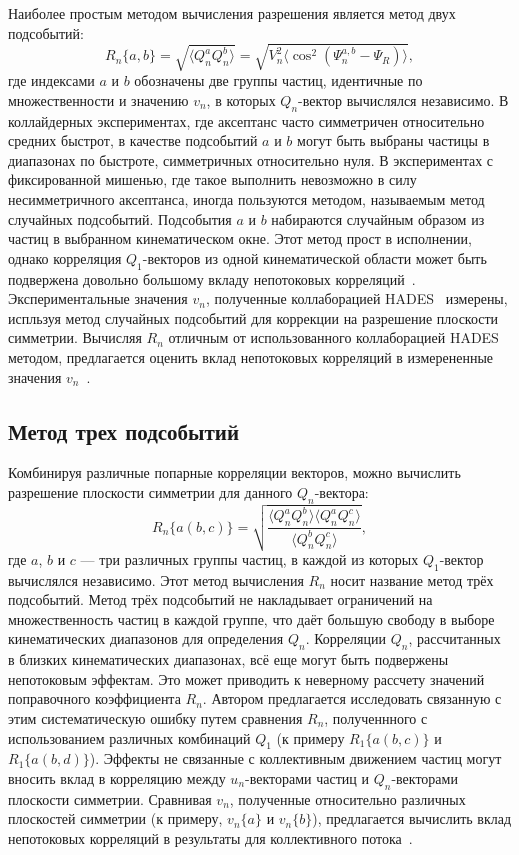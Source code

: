 Наиболее простым методом вычисления разрешения является метод двух подсобытий:
%
\begin{equation}
    R_n\{a,b\} = \sqrt{ \langle Q_n^a Q_n^b \rangle } = \sqrt{ V_n^2 \langle \cos^{2}( \Psi^{a,b}_n - \Psi_R ) \rangle },
\end{equation}
где индексами $a$ и $b$ обозначены две группы частиц, идентичные по множественности и значению $v_n$, в которых $Q_n$-вектор вычислялся независимо.
В коллайдерных экспериментах, где аксептанс часто симметричен относительно средних быстрот, в качестве подсобытий $a$ и $b$ могут быть выбраны частицы в диапазонах по быстроте, симметричных относительно нуля.
В экспериментах с фиксированной мишенью, где такое выполнить невозможно в силу несимметричного аксептанса, иногда пользуются методом, называемым метод случайных подсобытий.
Подсобытия $a$ и $b$ набираются случайным образом из частиц в выбранном кинематическом окне.
Этот метод прост в исполнении, однако корреляция $Q_1$-векторов из одной кинематической области может быть подвержена довольно большому вкладу непотоковых корреляций~\cite{Mamaev:2020lpi}.
Экспериментальные значения $v_n$, полученные коллаборацией HADES~\cite{HADES:2020lob} измерены, испльзуя метод случайных подсобытий для коррекции на разрешение плоскости симметрии. 
Вычисляя $R_n$ отличным от использованного коллаборацией HADES методом, предлагается оценить вклад непотоковых корреляций в измерененные значения $v_n$~\cite{Mamaev:2020lpi, Mamaev:2020qom}.

\subsection{Метод трех подсобытий}

Комбинируя различные попарные корреляции векторов, можно вычислить разрешение плоскости симметрии для данного $Q_n$-вектора:
%
\begin{equation}
    R_n\{a(b,c)\}  =  \sqrt { \frac{ \langle Q_n^a Q_n^b \rangle \langle Q_n^a Q_n^c \rangle }{ \langle Q_n^b Q_n^c \rangle} },
\end{equation}
%
где $a$, $b$ и $c$ --- три различных группы частиц, в каждой из которых $Q_1$-вектор вычислялся независимо.
Этот метод вычисления $R_n$ носит название метод трёх подсобытий.
Метод трёх подсобытий не накладывает ограничений на множественность частиц в каждой группе, что даёт большую свободу в выборе кинематических диапазонов для определения $Q_n$.
Корреляции $Q_n$, рассчитанных в близких кинематических диапазонах, всё еще могут быть подвержены непотоковым эффектам.
Это может приводить к неверному рассчету значений поправочного коэффициента $R_n$.
Автором предлагается исследовать связанную с этим систематическую ошибку путем сравнения $R_n$, полученнного с использованием различных комбинаций $Q_1$ (к примеру $R_1\{a(b,c)\}$ и $R_1\{a(b,d)\}$).
Эффекты не связанные с коллективным движением частиц могут вносить вклад в корреляцию между $u_n$-векторами частиц и $Q_n$-векторами плоскости симметрии.
Сравнивая $v_n$, полученные относительно различных плоскостей симметрии (к примеру, $v_n\{a\}$ и $v_n\{b\}$), предлагается вычислить вклад непотоковых корреляций в результаты для коллективного потока~\cite{Mamaev:2020qom,Mamaev:2023fpr,Mamaev:2023yhz,Mamaev:2024}. 

